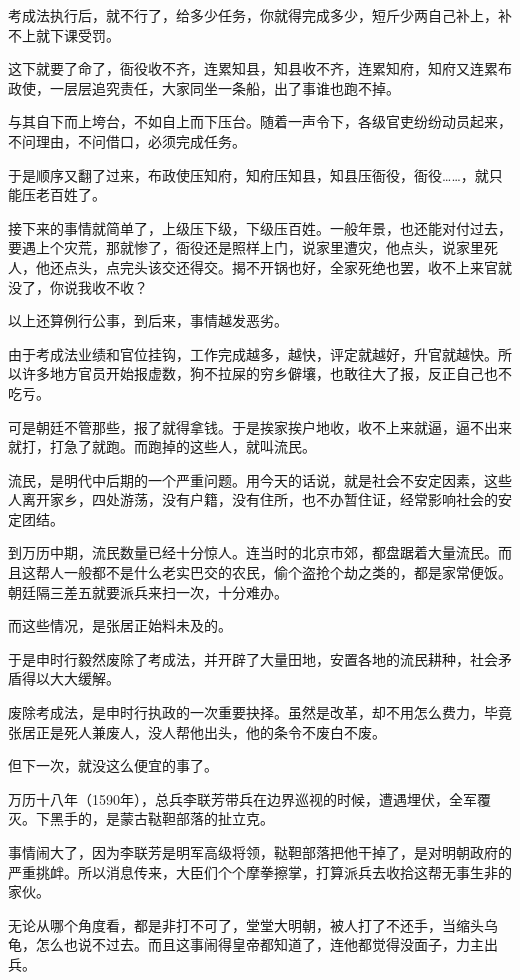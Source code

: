 \begin{multicols}{\theparacolNo}
		考成法执行后，就不行了，给多少任务，你就得完成多少，短斤少两自己补上，补不上就下课受罚。

		这下就要了命了，衙役收不齐，连累知县，知县收不齐，连累知府，知府又连累布政使，一层层追究责任，大家同坐一条船，出了事谁也跑不掉。

		与其自下而上垮台，不如自上而下压台。随着一声令下，各级官吏纷纷动员起来，不问理由，不问借口，必须完成任务。

		于是顺序又翻了过来，布政使压知府，知府压知县，知县压衙役，衙役……，就只能压老百姓了。

		接下来的事情就简单了，上级压下级，下级压百姓。一般年景，也还能对付过去，要遇上个灾荒，那就惨了，衙役还是照样上门，说家里遭灾，他点头，说家里死人，他还点头，点完头该交还得交。揭不开锅也好，全家死绝也罢，收不上来官就没了，你说我收不收？

		以上还算例行公事，到后来，事情越发恶劣。

		由于考成法业绩和官位挂钩，工作完成越多，越快，评定就越好，升官就越快。所以许多地方官员开始报虚数，狗不拉屎的穷乡僻壤，也敢往大了报，反正自己也不吃亏。

		可是朝廷不管那些，报了就得拿钱。于是挨家挨户地收，收不上来就逼，逼不出来就打，打急了就跑。而跑掉的这些人，就叫流民。

		流民，是明代中后期的一个严重问题。用今天的话说，就是社会不安定因素，这些人离开家乡，四处游荡，没有户籍，没有住所，也不办暂住证，经常影响社会的安定团结。

		到万历中期，流民数量已经十分惊人。连当时的北京市郊，都盘踞着大量流民。而且这帮人一般都不是什么老实巴交的农民，偷个盗抢个劫之类的，都是家常便饭。朝廷隔三差五就要派兵来扫一次，十分难办。

		而这些情况，是张居正始料未及的。

		于是申时行毅然废除了考成法，并开辟了大量田地，安置各地的流民耕种，社会矛盾得以大大缓解。

		废除考成法，是申时行执政的一次重要抉择。虽然是改革，却不用怎么费力，毕竟张居正是死人兼废人，没人帮他出头，他的条令不废白不废。

		但下一次，就没这么便宜的事了。

		万历十八年（1590年），总兵李联芳带兵在边界巡视的时候，遭遇埋伏，全军覆灭。下黑手的，是蒙古鞑靼部落的扯立克。

		事情闹大了，因为李联芳是明军高级将领，鞑靼部落把他干掉了，是对明朝政府的严重挑衅。所以消息传来，大臣们个个摩拳擦掌，打算派兵去收拾这帮无事生非的家伙。

		无论从哪个角度看，都是非打不可了，堂堂大明朝，被人打了不还手，当缩头乌龟，怎么也说不过去。而且这事闹得皇帝都知道了，连他都觉得没面子，力主出兵。


\end{multicols}
